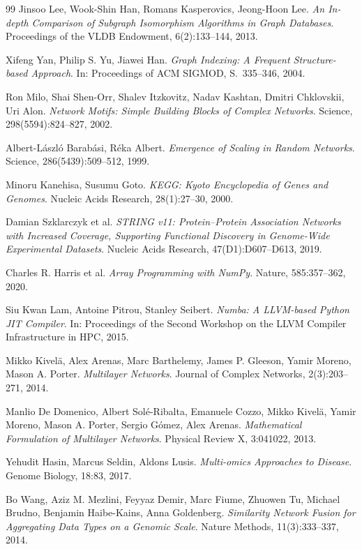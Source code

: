 \documentclass[a4paper,12pt, twoside]{report}
\theoremstyle{definition}
\begin{document}
\begin{thebibliography}{99}
Jinsoo Lee, Wook-Shin Han, Romans Kasperovics, Jeong-Hoon Lee.
\emph{An In-depth Comparison of Subgraph Isomorphism Algorithms in Graph Databases}.
Proceedings of the VLDB Endowment, 6(2):133--144, 2013.

Xifeng Yan, Philip S. Yu, Jiawei Han.
\emph{Graph Indexing: A Frequent Structure-based Approach}.
In: Proceedings of ACM SIGMOD, S.~335--346, 2004.

Ron Milo, Shai Shen-Orr, Shalev Itzkovitz, Nadav Kashtan, Dmitri Chklovskii, Uri Alon.
\emph{Network Motifs: Simple Building Blocks of Complex Networks}.
Science, 298(5594):824--827, 2002.

Albert-László Barabási, Réka Albert.
\emph{Emergence of Scaling in Random Networks}.
Science, 286(5439):509--512, 1999.

Minoru Kanehisa, Susumu Goto.
\emph{KEGG: Kyoto Encyclopedia of Genes and Genomes}.
Nucleic Acids Research, 28(1):27--30, 2000.

Damian Szklarczyk et al.
\emph{STRING v11: Protein--Protein Association Networks with Increased Coverage, Supporting Functional Discovery in Genome-Wide Experimental Datasets}.
Nucleic Acids Research, 47(D1):D607--D613, 2019.

Charles R. Harris et al.
\emph{Array Programming with NumPy}.
Nature, 585:357--362, 2020.

Siu Kwan Lam, Antoine Pitrou, Stanley Seibert.
\emph{Numba: A LLVM-based Python JIT Compiler}.
In: Proceedings of the Second Workshop on the LLVM Compiler Infrastructure in HPC, 2015.


Mikko Kivelä, Alex Arenas, Marc Barthelemy, James P. Gleeson, Yamir Moreno, Mason A. Porter.
\emph{Multilayer Networks}.
Journal of Complex Networks, 2(3):203--271, 2014.

Manlio De Domenico, Albert Solé-Ribalta, Emanuele Cozzo, Mikko Kivelä, Yamir Moreno, Mason A. Porter, Sergio Gómez, Alex Arenas.
\emph{Mathematical Formulation of Multilayer Networks}.
Physical Review X, 3:041022, 2013.

Yehudit Hasin, Marcus Seldin, Aldons Lusis.
\emph{Multi-omics Approaches to Disease}.
Genome Biology, 18:83, 2017.

Bo Wang, Aziz M. Mezlini, Feyyaz Demir, Marc Fiume, Zhuowen Tu, Michael Brudno, Benjamin Haibe-Kains, Anna Goldenberg.
\emph{Similarity Network Fusion for Aggregating Data Types on a Genomic Scale}.
Nature Methods, 11(3):333--337, 2014.


\end{thebibliography}
\end{document}
